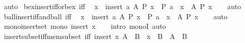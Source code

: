 \begin{isabellebody}
\ auto%
\endisatagproof
{\isafoldproof}%
%
\isadelimproof
\isanewline
%
\endisadelimproof
\isanewline
{}\isamarkupfalse%
\ bex{\isacharunderscore}{\kern0pt}insert{\isacharunderscore}{\kern0pt}iff{\isacharunderscore}{\kern0pt}or{\isacharunderscore}{\kern0pt}bex\ {\isacharbrackleft}{\kern0pt}iff{\isacharbrackright}{\kern0pt}{\isacharcolon}{\kern0pt}\isanewline
\ \ {\isachardoublequoteopen}{\isacharparenleft}{\kern0pt}{\isasymexists}x\ {\isasymin}\ insert\ a\ A{\isachardot}{\kern0pt}\ P\ x{\isacharparenright}{\kern0pt}\ {\isasymlongleftrightarrow}\ {\isacharparenleft}{\kern0pt}P\ a\ {\isasymor}\ {\isacharparenleft}{\kern0pt}{\isasymexists}x\ {\isasymin}\ A{\isachardot}{\kern0pt}\ P\ x{\isacharparenright}{\kern0pt}{\isacharparenright}{\kern0pt}{\isachardoublequoteclose}\isanewline
%
\isadelimproof
\ \ %
\endisadelimproof
%
\isatagproof
{}\isamarkupfalse%
\ auto%
\endisatagproof
{\isafoldproof}%
%
\isadelimproof
\isanewline
%
\endisadelimproof
\isanewline
{}\isamarkupfalse%
\ ball{\isacharunderscore}{\kern0pt}insert{\isacharunderscore}{\kern0pt}iff{\isacharunderscore}{\kern0pt}and{\isacharunderscore}{\kern0pt}ball\ {\isacharbrackleft}{\kern0pt}iff{\isacharbrackright}{\kern0pt}{\isacharcolon}{\kern0pt}\isanewline
\ \ {\isachardoublequoteopen}{\isacharparenleft}{\kern0pt}{\isasymforall}x\ {\isasymin}\ insert\ a\ A{\isachardot}{\kern0pt}\ P\ x{\isacharparenright}{\kern0pt}\ {\isasymlongleftrightarrow}\ {\isacharparenleft}{\kern0pt}P\ a\ {\isasymand}\ {\isacharparenleft}{\kern0pt}{\isasymforall}x\ {\isasymin}\ A{\isachardot}{\kern0pt}\ P\ x{\isacharparenright}{\kern0pt}{\isacharparenright}{\kern0pt}{\isachardoublequoteclose}\isanewline
%
\isadelimproof
\ \ %
\endisadelimproof
%
\isatagproof
{}\isamarkupfalse%
\ auto%
\endisatagproof
{\isafoldproof}%
%
\isadelimproof
\isanewline
%
\endisadelimproof
\isanewline
{}\isamarkupfalse%
\ mono{\isacharunderscore}{\kern0pt}insert{\isacharunderscore}{\kern0pt}set{\isacharcolon}{\kern0pt}\ {\isachardoublequoteopen}mono\ {\isacharparenleft}{\kern0pt}insert\ x{\isacharparenright}{\kern0pt}{\isachardoublequoteclose}\isanewline
%
\isadelimproof
\ \ %
\endisadelimproof
%
\isatagproof
{}\isamarkupfalse%
\ {\isacharparenleft}{\kern0pt}intro\ monoI{\isacharparenright}{\kern0pt}\ auto%
\endisatagproof
{\isafoldproof}%
%
\isadelimproof
\isanewline
%
\endisadelimproof
\isanewline
\isanewline
{}\isamarkupfalse%
\ insert{\isacharunderscore}{\kern0pt}subset{\isacharunderscore}{\kern0pt}iff{\isacharunderscore}{\kern0pt}mem{\isacharunderscore}{\kern0pt}subset\ {\isacharbrackleft}{\kern0pt}iff{\isacharbrackright}{\kern0pt}{\isacharcolon}{\kern0pt}\ {\isachardoublequoteopen}insert\ x\ A\ {\isasymsubseteq}\ B\ {\isasymlongleftrightarrow}\ x\ {\isasymin}\ B\ {\isasymand}\ A\ {\isasymsubseteq}\ B{\isachardoublequoteclose}\isanewline

\end{isabellebody}
